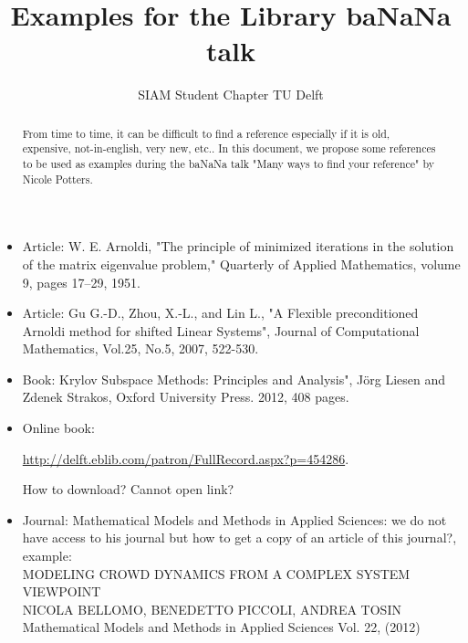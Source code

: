 \documentclass[a4paper,10pt]{article}
\title{Examples for the Library baNaNa talk}
\author{SIAM Student Chapter TU Delft}
\begin{document}
\maketitle

\begin{abstract}
From time to time, it can be difficult to find a reference especially if it is old, expensive, not-in-english, very new, etc..
In this document, we propose some references to be used as examples during the baNaNa talk "Many ways to find your reference" by Nicole Potters.
\end{abstract}
\begin{itemize}
 \item Article: W. E. Arnoldi, "The principle of minimized iterations in the solution of the matrix eigenvalue problem," Quarterly of Applied Mathematics, volume 9, pages 17--29, 1951.
\item Article: Gu G.-D., Zhou, X.-L., and Lin L., "A Flexible preconditioned Arnoldi method for shifted Linear Systems", Journal of Computational Mathematics, Vol.25, No.5, 2007, 522-530.
\item Book: Krylov Subspace Methods: Principles and Analysis", J\"{o}rg Liesen and Zdenek Strakos, Oxford University Press. 2012, 408 pages.
\item Online book: 

\url{http://delft.eblib.com/patron/FullRecord.aspx?p=454286}. 

How to download? Cannot open link?
\item Journal: Mathematical Models and Methods in Applied Sciences: we do not have access to his journal
but how to get a copy of an article of this journal?, example: \\
            
    MODELING CROWD DYNAMICS FROM A COMPLEX SYSTEM VIEWPOINT \\
    NICOLA BELLOMO, BENEDETTO PICCOLI, ANDREA TOSIN \\
    Mathematical Models and Methods in Applied Sciences Vol. 22, (2012) \\

 \end{itemize}
\end{document}
